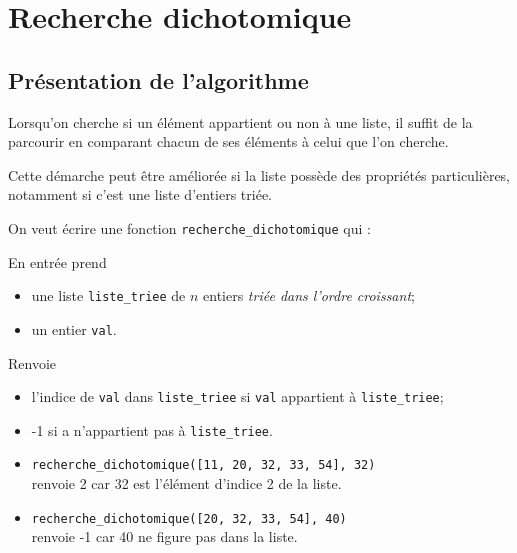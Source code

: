 
\chapter{Recherche dichotomique}

\section{Présentation de l'algorithme}

Lorsqu'on cherche si un élément appartient ou non à une liste, il suffit de la parcourir en comparant chacun de ses éléments à celui que l'on cherche.

Cette démarche peut être améliorée si la liste possède des propriétés particulières, notamment si c'est une liste d'entiers triée.


On veut écrire une fonction \texttt{recherche\_dichotomique} qui :

En entrée prend \begin{itemize}
	\item 	une liste \texttt{liste_triee} de $n$ entiers \textit{triée dans l'ordre croissant};
	\item 	un entier \texttt{val}.
\end{itemize}
Renvoie \begin{itemize}
	\item 	l'indice de \texttt{val} dans \texttt{liste_triee} si \texttt{val} appartient à \texttt{liste_triee};
	\item 	-1 si a n'appartient pas à \texttt{liste_triee}.
\end{itemize}



\begin{exemple}[]
	\begin{itemize}
		\item 	\texttt{recherche_dichotomique([11, 20, 32, 33, 54], 32)} \\renvoie 2 car 32 est l'élément d'indice 2 de la liste.
		\item 	\texttt{recherche_dichotomique([20, 32, 33, 54], 40)} \\renvoie -1 car 40 ne figure pas dans la liste.
	\end{itemize}
\end{exemple}

